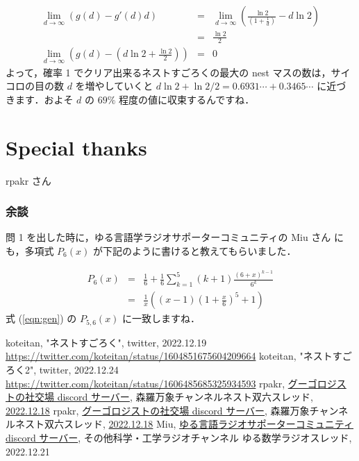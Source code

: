 \documentclass[a4j, 12pt]{jsarticle}
\renewcommand{\liminf}{\lim_{d\rightarrow\infty}}
\begin{document}
\begin{eqnarray}
  \liminf \left(g(d)-g'(d)d\right)&=&\liminf\left(\frac{\ln 2}{\left(1+\frac{1}{d}\right)}-d\ln 2\right)\\
                                  &=&\frac{\ln 2}{2}\\
  \liminf \left(g(d) - \left(d\ln 2 + \frac{\ln 2}{2}\right)\right) &=&0
\end{eqnarray}
よって，確率 1 でクリア出来るネストすごろくの最大の nest マスの数は，サイコロの目の数 $d$ を増やしていくと $d \ln2+\ln 2/2=0.6931\cdots+0.3465\cdots$ に近づきます．およそ $d$ の $69 \%$ 程度の値に収束するんですね．

\section*{Special thanks}
rpakr さん

\subsubsection{余談}
問 1\cite{nestsugoroku} を出した時に，ゆる言語学ラジオサポーターコミュニティの Miu さん \cite{miu} にも，多項式 $P_6(x)$ が下記のように書けると教えてもらいました．

\begin{eqnarray}
P_6(x)&=&\frac{1}{6}+\frac{1}{6}\sum_{k=1}^5(k+1)\frac{(6+x)^{k-1}}{6^k}\\
      &=&\frac{1}{x}\left((x-1)\left(1+\frac{x}{6}\right)^5+1\right)
\end{eqnarray}
式 (\ref{eqn:gen}) の $P_{5,6}(x)$ に一致しますね．

\begin{thebibliography}{99}
 koteitan, "ネストすごろく", twitter, 2022.12.19 \url{https://twitter.com/koteitan/status/1604851675604209664}
 koteitan, "ネストすごろく2", twitter, 2022.12.24 \url{https://twitter.com/koteitan/status/1606485685325934593}
 rpakr, \href{https://discordapp.com/invite/3XK4tq6}{グーゴロジストの社交場 discord サーバー}, 森羅万象チャンネルネスト双六スレッド, \href{https://discord.com/channels/444127369033416704/1053714648727310336/1053948216791552100}{2022.12.18}
 rpakr, \href{https://discordapp.com/invite/3XK4tq6}{グーゴロジストの社交場 discord サーバー}, 森羅万象チャンネルネスト双六スレッド, \href{https://discord.com/channels/444127369033416704/1053714648727310336/1053952001911832586}{2022.12.18}
 Miu, \href{https://yurugengo.com/}{ゆる言語ラジオ}\href{https://yurugengo.com/support}{サポーターコミュニティ discord サーバー}, その他科学・工学ラジオチャンネル ゆる数学ラジオスレッド, 2022.12.21
\end{thebibliography}
 
\end{document}
